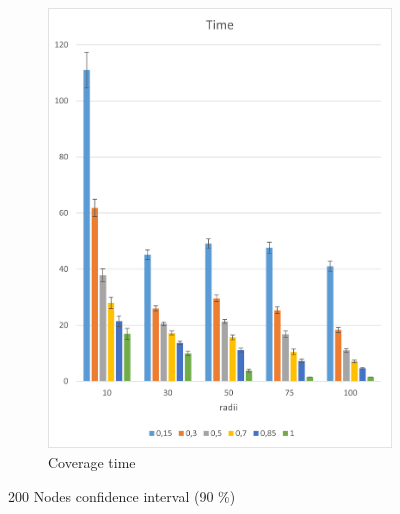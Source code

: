 \begin{figure}[H]
\begin{subfigure}{.5\textwidth}
  \includegraphics[width=1\linewidth]{./images/200endtimeCI.png}
  \caption{Coverage time}
  \label{fig:sub2}
\end{subfigure}
\caption{200 Nodes confidence interval (90 \%)}
\label{fig:test}
\end{figure}

